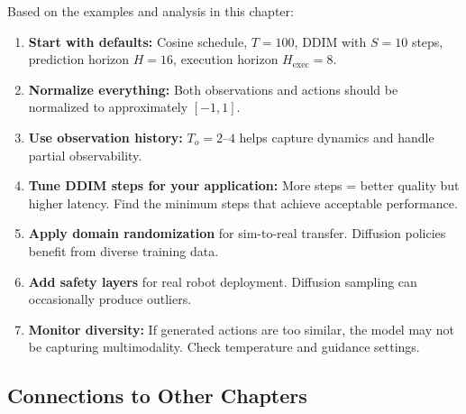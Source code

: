 Based on the examples and analysis in this chapter:

\begin{enumerate}
    \item \textbf{Start with defaults:} Cosine schedule, $T = 100$, DDIM with $S = 10$ steps, prediction horizon $H = 16$, execution horizon $H_{\text{exec}} = 8$.

    \item \textbf{Normalize everything:} Both observations and actions should be normalized to approximately $[-1, 1]$.

    \item \textbf{Use observation history:} $T_o = 2$--$4$ helps capture dynamics and handle partial observability.

    \item \textbf{Tune DDIM steps for your application:} More steps = better quality but higher latency. Find the minimum steps that achieve acceptable performance.

    \item \textbf{Apply domain randomization} for sim-to-real transfer. Diffusion policies benefit from diverse training data.

    \item \textbf{Add safety layers} for real robot deployment. Diffusion sampling can occasionally produce outliers.

    \item \textbf{Monitor diversity:} If generated actions are too similar, the model may not be capturing multimodality. Check temperature and guidance settings.
\end{enumerate}

\subsection{Connections to Other Chapters}

